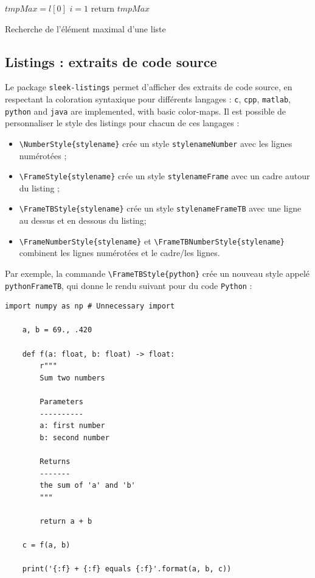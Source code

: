 \documentclass[a4paper, 12pt]{report}
\def\tbs{\textbackslash}
\begin{document}
\begin{algorithm}[H]
  \SetAlgoLined
  \;
  $tmpMax = l[0]$\;
  $i = 1$\;
  return $tmpMax$\;
  \caption{Recherche de l'élément maximal d'une liste}
\end{algorithm}

    \subsection{Listings : extraits de code source}

    Le package \texttt{sleek-listings} permet d'afficher des extraits de code source, en respectant la coloration syntaxique pour différents langages : \texttt{c}, \texttt{cpp}, \texttt{matlab}, \texttt{python} and \texttt{java} are implemented, with basic color-maps. Il est possible de personnaliser le style des listings pour chacun de ces langages :
    \begin{itemize}
        \item \texttt{\tbs{}NumberStyle\{stylename\}} crée un style \texttt{stylenameNumber} avec les lignes numérotées ;
        \item \texttt{\tbs{}FrameStyle\{stylename\}} crée un style \texttt{stylenameFrame} avec un cadre autour du listing ;
        \item \texttt{\tbs{}FrameTBStyle\{stylename\}} crée un style \texttt{stylenameFrameTB} avec une ligne au dessus et en dessous du listing;
        \item \texttt{\tbs{}FrameNumberStyle\{stylename\}} et \texttt{\tbs{}FrameTBNumberStyle\{stylename\}} combinent les lignes numérotées et le cadre/les lignes.
    \end{itemize}

    Par exemple, la commande \texttt{\tbs{}FrameTBStyle\{python\}} crée un nouveau style appelé \texttt{pythonFrameTB}, qui donne le rendu suivant pour du code \texttt{Python} :

    \begin{lstlisting}[style=pythonFrameTB, gobble=4]
    import numpy as np # Unnecessary import

    a, b = 69., .420

    def f(a: float, b: float) -> float:
        r"""
        Sum two numbers

        Parameters
        ----------
        a: first number
        b: second number

        Returns
        -------
        the sum of 'a' and 'b'
        """

        return a + b

    c = f(a, b)

    print('{:f} + {:f} equals {:f}'.format(a, b, c))
    \end{lstlisting}
\end{document}
